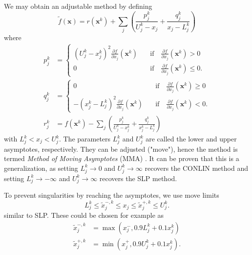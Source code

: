 We may obtain an adjustable method by defining
\begin{equation}
    \tilde{f}(\mathbf{x}) = r(\mathbf{x}^k) + \sum_j \left( \frac{p_{j}^k}{U^k_j-x_j} + \frac{q_{j}^k}{x_j-L^k_j} \right) 
    \label{eq:mma_start}
\end{equation}
where
\begin{align}
    p_{j}^k &= 
    \begin{cases}
        (U^k_j-x^k_j)^2 \frac{\partial f}{\partial x_j} (\mathbf{x}^k)  &\quad \text{if} \quad \frac{\partial f}{\partial x_j} (\mathbf{x}^k) > 0 \\
        0 &\quad \text{if} \quad \frac{\partial f}{\partial x_j} (\mathbf{x}^k) \le 0.
    \end{cases} \\ 
    q_{j}^k &= 
    \begin{cases}
         0 &\quad \text{if} \quad \frac{\partial f}{\partial x_j} (\mathbf{x}^k) \ge 0 \\
        - (x^k_j-L^k_j)^2 \frac{\partial f}{\partial x_j} (\mathbf{x}^k) &\quad \text{if} \quad \frac{\partial f}{\partial x_j} (\mathbf{x}^k) < 0.
    \end{cases} \\ 
    r_j^k &= f(\mathbf{x}^k) - \sum_j \left(\frac{p_{j}^k}{U^k_j-x^k_j} + \frac{q_{j}^k}{x^k_j-L^k_j}  \right)
    \label{eq:mma_end}
\end{align}
with $L^k_j < x_j < U^k_j$. The parameters $L^k_j$ and $U_j^k$ are called the lower and upper asymptotes, respectively. They can be adjusted ("move"), hence the method is termed \emph{Method of Moving Asymptotes} (MMA) \cite{Svanberg1987}. It can be proven that this is a generalization, as setting $L^k_j \rightarrow 0$ and $U^k_j \rightarrow \infty$ recovers the CONLIN method and setting  $L^k_j \rightarrow -\infty$ and $U^k_j \rightarrow \infty$ recovers the SLP method.

To prevent singularities by reaching the asymptotes, we use move limits 
\begin{equation}
    L^k_j \le \tilde{x}_j^{-,k} \le x_j \le \tilde{x}_j^{+,k} \le U_j^k.
\end{equation}
similar to SLP. These could be chosen for example as 
\begin{align}
    \tilde{x}_j^{-,k} &= \max(x^-_j,  0.9 L_j^k + 0.1 x_j^k) \\
    \tilde{x}_j^{+,k} &= \min(x^+_j, 0.9 U_j^k + 0.1 x_j^k).
    \label{eq:mma_move_limits}
\end{align}

